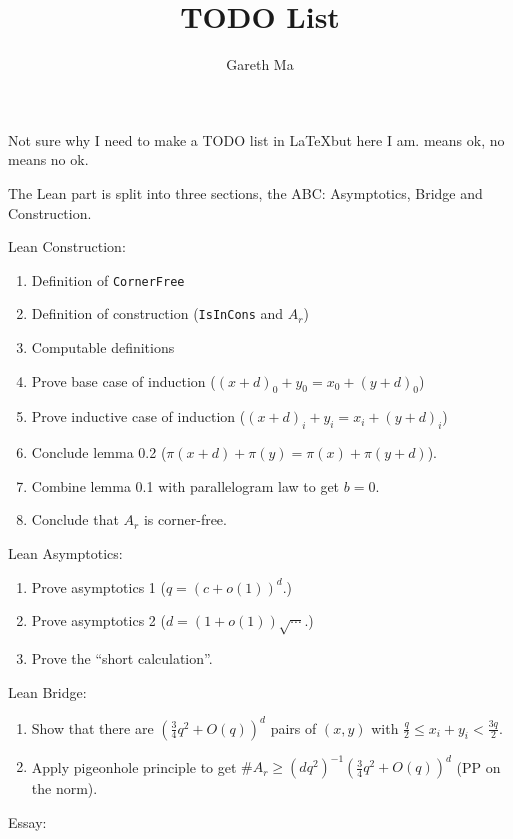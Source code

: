 \documentclass{article}
\title{TODO List}
\author{Gareth Ma}
\begin{document}
 \maketitle

Not sure why I need to make a TODO list in \LaTeX but here I am. \ok means ok, no \ok means no ok.

The Lean part is split into three sections, the ABC: Asymptotics, Bridge and Construction.

Lean Construction:

\begin{enumerate}
\item \ok Definition of \texttt{CornerFree}
\item \ok Definition of construction (\texttt{IsInCons} and \(A_r\))
\item \ok Computable definitions
\item \ok Prove base case of induction (\((x + d)_0 + y_0 = x_0 + (y + d)_0\))
\item Prove inductive case of induction (\((x + d)_i + y_i = x_i + (y + d)_i\))
\item \ok Conclude lemma 0.2 (\(\pi(x + d) + \pi(y) = \pi(x) + \pi(y + d)\)).
\item Combine lemma 0.1 with parallelogram law to get \(b = 0\).
\item \ok Conclude that \(A_r\) is corner-free.
\end{enumerate}

Lean Asymptotics:

\begin{enumerate}
\item \ok Prove asymptotics 1 (\(q = (c + o(1))^d\).)
\item \ok Prove asymptotics 2 (\(d = (1 + o(1))\sqrt{\cdots}\).)
\item Prove the ``short calculation''.
\end{enumerate}

Lean Bridge:

\begin{enumerate}
\item Show that there are \((\frac{3}{4}q^2 + O(q))^d\) pairs of \((x, y)\) with \(\frac{q}{2} \leq x_i + y_i < \frac{3q}{2}\).
\item Apply pigeonhole principle to get \(\#A_r \geq (dq^2)^{-1}(\frac{3}{4}q^2 + O(q))^d\) (PP on the norm).
\end{enumerate}

\pagebreak

Essay:
\end{document}
